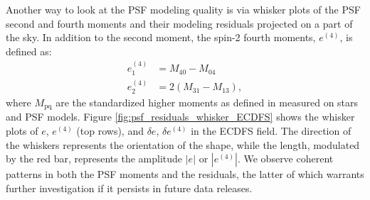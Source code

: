 Another way to look at the PSF modeling quality is via whisker plots of the PSF second and fourth moments and their modeling residuals projected on a part of the sky. 
In addition to the second moment, the spin-2 fourth moments, $e^{(4)}$, is defined as:
\begin{align*}
e^{(4)}_1 &= M_{\text{40}} - M_{\text{04}} \\
e^{(4)}_2 &= 2\left(M_{\text{31}} - M_{\text{13}}\right),
\end{align*}
where $M_{\text{pq}}$ are the standardized higher moments as defined in \cite{2023MNRAS.520.2328Z} measured on stars and PSF models. 
Figure \ref{fig:psf_residuals_whisker_ECDFS} shows 
the whisker plots of $e$, $e^{(4)}$ (top rows), and $\delta e$, $\delta e^{(4)}$
in the ECDFS field. The direction of the whiskers represents the orientation of the shape, while the length, modulated by the red bar, represents the amplitude $|e|$ or $|e^{(4)}|$. 
We observe coherent patterns in both the PSF moments and the residuals, the latter of which warrants further investigation if it persists in future data releases.
